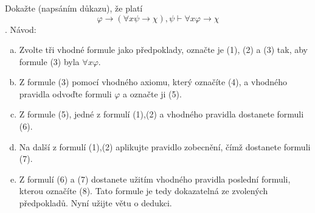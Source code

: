 \subsubsection{}
Dokažte (napsáním důkazu), že platí
$$\varphi \rightarrow(\forall x \psi \rightarrow \chi),\psi\vdash \forall x
\varphi \rightarrow \chi$$.
Návod:
\begin{enumerate}[a)]
  \item Zvolte tři vhodné formule jako předpoklady, označte je (1), (2) a (3)
  tak, aby formule (3) byla $\forall x \varphi$.
  \item Z formule (3) pomocí vhodného axiomu, který označíte (4), a vhodného
  pravidla odvoďte formuli $\varphi$ a označte ji (5).
  \item Z formule (5), jedné z formulí (1),(2) a vhodného pravidla dostanete
  formuli (6).
  \item Na další z formulí (1),(2) aplikujte pravidlo zobecnění, čímž dostanete
  formuli (7).
  \item Z formulí (6) a (7) dostanete užitím vhodného pravidla poslední formuli,
  kterou označíte (8). Tato formule je tedy dokazatelná ze zvolených
  předpokladů. Nyní užijte větu o dedukci.
\end{enumerate}

